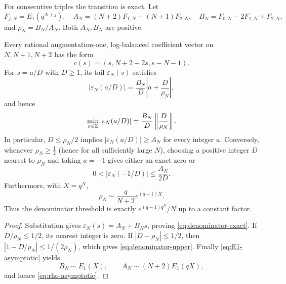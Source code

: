 For consecutive triples the transition is exact.  Let
\[
 F_{j,N}=E_1(q^{N+j}),
 \quad
 A_N=(N+2)F_{1,N}-(N+1)F_{2,N},
 \quad
 B_N=F_{0,N}-2F_{1,N}+F_{2,N},
\]
and \(\rho_N=B_N/A_N\).  Both \(A_N,B_N\) are positive.

\begin{theorem}
\label{thm:denominator-transition}
Every rational augmentation-one, log-balanced coefficient vector on
\(N,N+1,N+2\) has the form
\[
 c(s)=(s,N+2-2s,s-N-1).
\]
For \(s=a/D\) with \(D\ge1\), its tail \(\varepsilon_N(s)\) satisfies
\begin{equation}\label{eq:denominator-exact}
 \boxed{\displaystyle
 |\varepsilon_N(a/D)|
 =\frac{B_N}{D}\left|a+\frac D{\rho_N}\right|,}
\end{equation}
and hence
\[
 \min_{a\in\mathbb Z}|\varepsilon_N(a/D)|
 =\frac{B_N}{D}\left\|\frac D{\rho_N}\right\|.
\]
In particular, \(D\le\rho_N/2\) implies
\(|\varepsilon_N(a/D)|\ge A_N\) for every integer \(a\).  Conversely,
whenever \(\rho_N\ge\tfrac12\) (hence for all sufficiently large \(N\)),
choosing a positive integer \(D\) nearest to \(\rho_N\) and taking
\(a=-1\) gives either an exact zero or
\begin{equation}\label{eq:denominator-upper}
 0<|\varepsilon_N(-1/D)|\le\frac{A_N}{2D}.
\end{equation}
Furthermore, with \(X=q^N\),
\begin{equation}\label{eq:rho-asymptotic}
 \rho_N\sim\frac q{N+2}e^{(q-1)X}.
\end{equation}
Thus the denominator threshold is exactly
\(e^{(q-1)q^N}/N\) up to a constant factor.
\end{theorem}

\begin{proof}
Substitution gives \(\varepsilon_N(s)=A_N+B_Ns\), proving
\eqref{eq:denominator-exact}.  If \(D/\rho_N\le1/2\), its nearest integer
is zero.  If \(|D-\rho_N|\le1/2\), then
\(|1-D/\rho_N|\le1/(2\rho_N)\), which gives
\eqref{eq:denominator-upper}.  Finally \eqref{eq:E1-asymptotic} yields
\[
 B_N\sim E_1(X),
 \qquad
 A_N\sim(N+2)E_1(qX),
\]
and hence \eqref{eq:rho-asymptotic}.
\end{proof}

